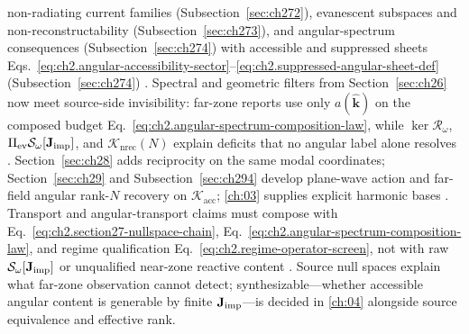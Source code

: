non-radiating current families (Subsection~\ref{sec:ch272}),
evanescent subspaces and non-reconstructability (Subsection~\ref{sec:ch273}), and angular-spectrum
consequences (Subsection~\ref{sec:ch274}) with accessible and
suppressed sheets Eqs.~\eqref{eq:ch2.angular-accessibility-sector}--\eqref{eq:ch2.suppressed-angular-sheet-def}
(Subsection~\ref{sec:ch274}) \cite{stratton1941}. Spectral and
geometric filters from Section~\ref{sec:ch26} now meet source-side invisibility: far-zone reports
use only \(a(\widehat{\mathbf{k}})\) on the composed budget
Eq.~\eqref{eq:ch2.angular-spectrum-composition-law}, while \(\ker\mathcal{R}_\omega\),
\(\Pi_{\mathrm{ev}}\mathcal{S}_\omega[\mathbf{J}_{\mathrm{imp}}]\), and \(\mathcal{K}_{\mathrm{nrec}}(N)\) explain
deficits that no angular label alone resolves \cite{stratton1941}. Section~\ref{sec:ch28} adds
reciprocity on the same modal coordinates; Section~\ref{sec:ch29} and Subsection~\ref{sec:ch294}
develop plane-wave action and far-field angular rank-$N$ recovery on \(\mathcal{K}_{\mathrm{acc}}\);
\ref{ch:03} supplies explicit harmonic bases \cite{harrington2001}. Transport and
angular-transport claims must compose with
Eq.~\eqref{eq:ch2.section27-nullspace-chain},
Eq.~\eqref{eq:ch2.angular-spectrum-composition-law}, and regime qualification
Eq.~\eqref{eq:ch2.regime-operator-screen}, not with raw \(\mathcal{S}_\omega[\mathbf{J}_{\mathrm{imp}}]\) or
unqualified near-zone reactive content \cite{stratton1941}. Source
null spaces explain what far-zone observation cannot detect; synthesizable---whether
accessible angular content is generable by finite \(\mathbf{J}_{\mathrm{imp}}\)---is decided in
\ref{ch:04} alongside source equivalence and effective rank.
